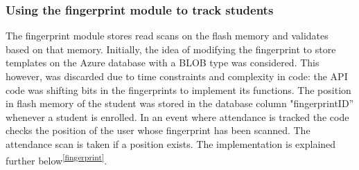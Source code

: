 \subsubsection*{Using the fingerprint module to track students}
The fingerprint module stores read scans on the flash memory and validates based on that memory. Initially, the idea  of modifying the fingerprint to store templates on the Azure database with a BLOB type was considered. This however, was discarded due to time constraints and complexity in code: the \gls{API} code was shifting bits in the fingerprints to implement its functions. The position in flash memory of the student was stored in the database column "fingerprintID” whenever a student is enrolled. In an event where attendance is tracked the code checks the position of the user whose fingerprint has been scanned. The attendance scan is taken if a position exists. The implementation is explained further below\textsuperscript{\ref{fingerprint}}.
 
